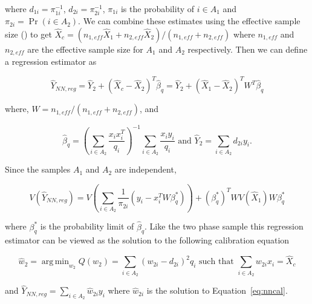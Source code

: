 \documentclass[12pt]{article}
\DeclareMathOperator*{\argmin}{arg\,min}
\begin{document}
where $d_{1i} = \pi_{1i}^{-1}$, $d_{2i} = \pi_{2i}^{-1}$, $\pi_{1i}$ is the
probability of $i \in A_1$ and $\pi_{2i} = \Pr(i \in A_2)$. 
We can combine these estimates using the effective sample size 
(\cite{kish1965survey}) to get
$\hat X_c = (n_{1, eff} \hat X_1 + n_{2, eff}\hat X_2) / (n_{1, eff} + n_{2,
eff})$ where $n_{1, eff}$ and $n_{2, eff}$ are the effective sample size for
$A_1$ and $A_2$ respectively. Then we can define a regression estimator as

$$
\hat Y_{NN, reg} = \hat Y_2 + (\hat X_c - \hat X_2)^T \hat \beta_q = 
\hat Y_2 + (\hat X_1 - \hat X_2)^T W^T\hat \beta_q 
$$

where, $W = n_{1, eff} / (n_{1, eff} + n_{2, eff})$, and

$$\hat \beta_q = \left(\sum_{i \in A_2} \frac{x_i x_i^T}{q_i}\right)^{-1}
\sum_{i \in A_2} \frac{x_i y_i}{q_i} \text{ and }\hat Y_2 = \sum_{i \in A_2}
d_{2i} y_i. $$

Since the samples $A_1$ and $A_2$ are independent, 

$$V(\hat Y_{NN, reg}) = V\left(\sum_{i \in A_2} \frac{1}{\pi_{2i}}(y_i -
x_i^TW\beta^*_q)\right) + (\beta^*_q)^T W V(\hat X_1) W \beta_q^*$$

where $\beta_q^*$ is the probability limit of $\hat \beta_q$. Like the two phase
sample this regression estimator can be viewed as the solution to the following
calibration equation 

\begin{equation}\label{eq:nncal}
  \hat w_2 = \argmin_{w_2} Q(w_2) = \sum_{i \in A_2} (w_{2i} - d_{2i})^2 q_i 
  \text{ such that } \sum_{i \in A_2} w_{2i} x_i = \hat X_c
\end{equation}

and $\hat Y_{NN, reg} = \sum_{i \in A_2} \hat w_{2i} y_i$ where $\hat
w_{2i}$ is the solution to Equation~\ref{eq:nncal}.
\end{document}
